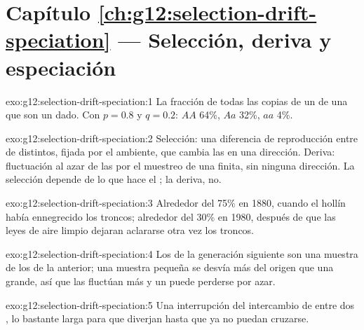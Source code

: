 \section*{Capítulo \ref{ch:g12:selection-drift-speciation} --- Selección, deriva y especiación}

\begin{solution}{exo:g12:selection-drift-speciation:1}
La fracción de todas las copias de un  de una  que son un
 dado. Con $p = 0.8$ y $q = 0.2$: $AA$ 64\%, $Aa$ 32\%, $aa$ 4\%.
\end{solution}

\begin{solution}{exo:g12:selection-drift-speciation:2}
Selección: una diferencia de reproducción entre  de 
distintos, fijada por el ambiente, que cambia las  en una
dirección. Deriva: fluctuación al azar de las  por el
muestreo de una  finita, sin ninguna dirección. La selección
depende de lo que hace el ; la deriva, no.
\end{solution}

\begin{solution}{exo:g12:selection-drift-speciation:3}
Alrededor del 75\% en 1880, cuando el hollín había ennegrecido los
troncos; alrededor del 30\% en 1980, después de que las leyes de aire
limpio dejaran aclararse otra vez los troncos.
\end{solution}

\begin{solution}{exo:g12:selection-drift-speciation:4}
Los  de la generación siguiente son una muestra de los de la
anterior; una muestra pequeña se desvía más del origen que una grande,
así que las  fluctúan más y un  puede perderse por
azar.
\end{solution}

\begin{solution}{exo:g12:selection-drift-speciation:5}
Una interrupción del intercambio de  entre dos , lo
bastante larga para que diverjan hasta que ya no puedan cruzarse.
\end{solution}

